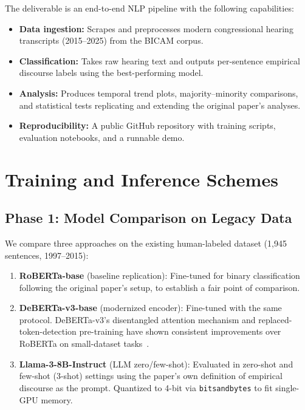 \documentclass[11pt,a4paper]{article}
\begin{document}
The deliverable is an end-to-end NLP pipeline with the following capabilities:
\begin{itemize}[nosep]
  \item \textbf{Data ingestion:} Scrapes and preprocesses modern congressional hearing transcripts (2015--2025) from the BICAM corpus.
  \item \textbf{Classification:} Takes raw hearing text and outputs per-sentence empirical discourse labels using the best-performing model.
  \item \textbf{Analysis:} Produces temporal trend plots, majority--minority comparisons, and statistical tests replicating and extending the original paper's analyses.
  \item \textbf{Reproducibility:} A public GitHub repository with training scripts, evaluation notebooks, and a runnable demo.
\end{itemize}

\section{Training and Inference Schemes}

\subsection{Phase 1: Model Comparison on Legacy Data}

We compare three approaches on the existing human-labeled dataset (1,945 sentences, 1997--2015):

\begin{enumerate}[nosep]
  \item \textbf{RoBERTa-base} (baseline replication): Fine-tuned for binary classification following the original paper's setup, to establish a fair point of comparison.
  \item \textbf{DeBERTa-v3-base} (modernized encoder): Fine-tuned with the same protocol. DeBERTa-v3's disentangled attention mechanism and replaced-token-detection pre-training have shown consistent improvements over RoBERTa on small-dataset tasks~\cite{he2023debertav3}.
  \item \textbf{Llama-3-8B-Instruct} (LLM zero/few-shot): Evaluated in zero-shot and few-shot (3-shot) settings using the paper's own definition of empirical discourse as the prompt. Quantized to 4-bit via \texttt{bitsandbytes} to fit single-GPU memory.
\end{enumerate}
\end{document}
